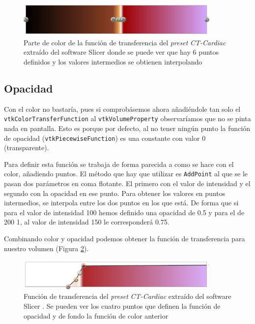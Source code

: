 \begin{figure}[H]
	\centering
	\includegraphics[width=10cm]{imagenes/color_tf}
	\caption{Parte de color de la función de transferencia del \textit{preset} \textit{CT-Cardiac} extraído del software Slicer \cite{slicer} donde se puede ver que hay 6 puntos definidos y los valores intermedios se obtienen interpolando}
	\label{fig:color_tf}
\end{figure}

\subsection{Opacidad}

Con el color no bastaría, pues si comprobásemos ahora añadiéndole tan solo el \texttt{vtkColorTransferFunction} al \texttt{vtkVolumeProperty} observaríamos que no se pinta nada en pantalla. Esto es porque por defecto, al no tener ningún punto la función de opacidad (\texttt{vtkPiecewiseFunction}) es una constante con valor 0 (transparente). 

Para definir esta función se trabaja de forma parecida a como se hace con el color, añadiendo puntos. El método que hay que utilizar es \texttt{AddPoint} al que se le pasan dos parámetros en coma flotante. El primero con el valor de intensidad y el segundo con la opacidad en ese punto. Para obtener los valores en puntos intermedios, se interpola entre los dos puntos en los que está. De forma que si para el valor de intensidad 100 hemos definido una opacidad de 0.5 y para el de 200 1, al valor de intensidad 150 le corresponderá 0.75.

Combinando color y opacidad podemos obtener la función de transferencia para nuestro volumen (Figura \ref{fig:opacity_tf}). 

\begin{figure}[H]
	\centering
	\includegraphics[width=10cm]{imagenes/opacity_tf}
	\caption{Función de transferencia del \textit{preset} \textit{CT-Cardiac} extraído del software Slicer \cite{slicer}. Se pueden ver los cuatro puntos que definen la función de opacidad y de fondo la función de color anterior}
	\label{fig:opacity_tf}
\end{figure}
